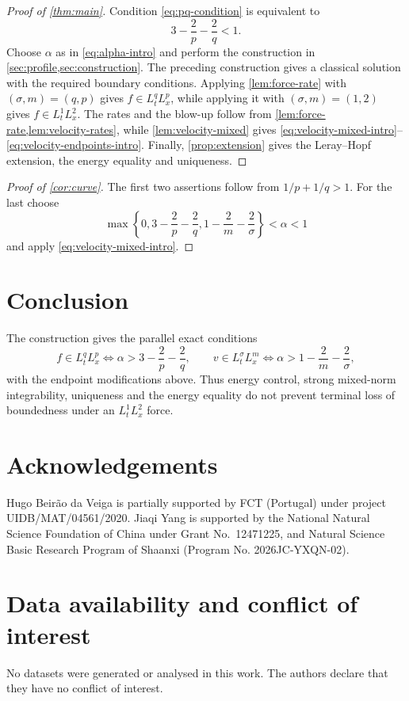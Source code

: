\documentclass[10pt]{amsart}
\theoremstyle{definition}
\begin{document}
\begin{proof}[Proof of \cref{thm:main}]
Condition \eqref{eq:pq-condition} is equivalent to
\[
    3-\frac2p-\frac2q<1.
\]
Choose $\alpha$ as in \eqref{eq:alpha-intro} and perform the construction in
\cref{sec:profile,sec:construction}.  The preceding construction gives a classical solution with the required boundary conditions.  Applying
\cref{lem:force-rate} with $(\sigma,m)=(q,p)$ gives $f\in L^q_tL^p_x$, while applying
it with $(\sigma,m)=(1,2)$ gives $f\in L^1_tL^2_x$.  The rates and the blow-up follow
from \cref{lem:force-rate,lem:velocity-rates}, while
\cref{lem:velocity-mixed} gives \eqref{eq:velocity-mixed-intro}--
\eqref{eq:velocity-endpoints-intro}.  Finally,
\cref{prop:extension} gives the Leray--Hopf extension, the energy equality and
uniqueness.
\end{proof}

\begin{proof}[Proof of \cref{cor:curve}]
The first two assertions follow from $1/p+1/q>1$.  For the last choose
\[
 \max\left\{0,3-\frac2p-\frac2q,
 1-\frac2m-\frac2\sigma\right\}<\alpha<1
\]
and apply \eqref{eq:velocity-mixed-intro}.
\end{proof}

\section{Conclusion}
The construction gives the parallel exact conditions
\[
 f\in L^q_tL^p_x\iff\alpha>3-\frac2p-\frac2q,
 \qquad
 v\in L^\sigma_tL^m_x\iff\alpha>1-\frac2m-\frac2\sigma,
\]
with the endpoint modifications above.  Thus energy control, strong mixed-norm
integrability, uniqueness and the energy equality do not prevent terminal loss
of boundedness under an $L^1_tL^2_x$ force.

\section*{Acknowledgements}
Hugo Beir\~ao da Veiga is partially supported by FCT (Portugal) under project
UIDB/MAT/04561/2020.  Jiaqi Yang is supported by the National Natural Science
Foundation of China under Grant No.~12471225, and Natural Science Basic Research Program of Shaanxi (Program No. 2026JC-YXQN-02). 


\section*{Data availability and conflict of interest}
No datasets were generated or analysed in this work.  The authors declare that they
have no conflict of interest.
\end{document}

